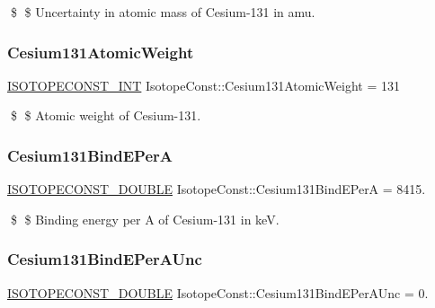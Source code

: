 \$ \$ Uncertainty in atomic mass of Cesium-\/131 in amu. \mbox{\label{group___isotope_const-_cesium-_cs131_ga6b9e1fddb824e3583564b541900ccddc}} 
\subsubsection{\texorpdfstring{Cesium131\+Atomic\+Weight}{Cesium131AtomicWeight}}
{\footnotesize\ttfamily \mbox{\hyperlink{group___isotope_const-_macros_ga5f18360b3e99483a35c32d789e62621c}{I\+S\+O\+T\+O\+P\+E\+C\+O\+N\+S\+T\+\_\+\+I\+NT}} Isotope\+Const\+::\+Cesium131\+Atomic\+Weight = 131}

\$ \$ Atomic weight of Cesium-\/131. \mbox{\label{group___isotope_const-_cesium-_cs131_ga40eb55baa35229de160b789538846938}} 
\subsubsection{\texorpdfstring{Cesium131\+Bind\+E\+PerA}{Cesium131BindEPerA}}
{\footnotesize\ttfamily \mbox{\hyperlink{group___isotope_const-_macros_ga8f45a7272ce02c0b4c65c44636ed719a}{I\+S\+O\+T\+O\+P\+E\+C\+O\+N\+S\+T\+\_\+\+D\+O\+U\+B\+LE}} Isotope\+Const\+::\+Cesium131\+Bind\+E\+PerA = 8415.}

\$ \$ Binding energy per A of Cesium-\/131 in keV. \mbox{\label{group___isotope_const-_cesium-_cs131_ga6d1cb31977a0ee7ded9425479a03f75b}} 
\subsubsection{\texorpdfstring{Cesium131\+Bind\+E\+Per\+A\+Unc}{Cesium131BindEPerAUnc}}
{\footnotesize\ttfamily \mbox{\hyperlink{group___isotope_const-_macros_ga8f45a7272ce02c0b4c65c44636ed719a}{I\+S\+O\+T\+O\+P\+E\+C\+O\+N\+S\+T\+\_\+\+D\+O\+U\+B\+LE}} Isotope\+Const\+::\+Cesium131\+Bind\+E\+Per\+A\+Unc = 0.}

